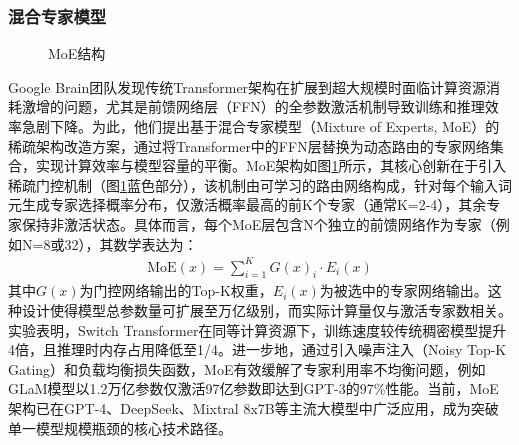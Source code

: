 \documentclass[UTF8,a4paper,12pt]{ctexart}
\numberwithin{equation}{section}
\begin{document}
\subsubsection{混合专家模型}
\begin{figure}[H]
	\caption{MoE结构}
	\label{MoE}
\end{figure}
Google Brain团队发现传统Transformer架构在扩展到超大规模时面临计算资源消耗激增的问题，尤其是前馈网络层（FFN）的全参数激活机制导致训练和推理效率急剧下降。为此，他们提出基于混合专家模型（Mixture of Experts, MoE）的稀疏架构改造方案，通过将Transformer中的FFN层替换为动态路由的专家网络集合，实现计算效率与模型容量的平衡。MoE架构如图\ref{MoE}所示，其核心创新在于引入稀疏门控机制（图\ref{MoE}蓝色部分），该机制由可学习的路由网络构成，针对每个输入词元生成专家选择概率分布，仅激活概率最高的前K个专家（通常K=2-4），其余专家保持非激活状态。具体而言，每个MoE层包含N个独立的前馈网络作为专家（例如N=8或32），其数学表达为：
\begin{eqnarray}
	\mathrm{MoE}(x)=\sum_{i=1}^KG(x)_i\cdot E_i(x)
	\label{func_5}
\end{eqnarray}
其中$G(x)$为门控网络输出的Top-K权重，$E_i(x)$为被选中的专家网络输出。这种设计使得模型总参数量可扩展至万亿级别，而实际计算量仅与激活专家数相关。实验表明，Switch Transformer在同等计算资源下，训练速度较传统稠密模型提升4倍，且推理时内存占用降低至1/4。进一步地，通过引入噪声注入（Noisy Top-K Gating）和负载均衡损失函数，MoE有效缓解了专家利用率不均衡问题，例如GLaM模型以1.2万亿参数仅激活97亿参数即达到GPT-3的97\%性能。当前，MoE架构已在GPT-4、DeepSeek、Mixtral 8x7B等主流大模型中广泛应用，成为突破单一模型规模瓶颈的核心技术路径。
\end{document}
